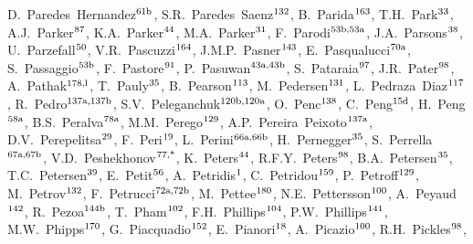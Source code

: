 \begin{flushleft}
D.~Paredes~Hernandez$^\textrm{\scriptsize 61b}$,    
S.R.~Paredes~Saenz$^\textrm{\scriptsize 132}$,    
B.~Parida$^\textrm{\scriptsize 163}$,    
T.H.~Park$^\textrm{\scriptsize 33}$,    
A.J.~Parker$^\textrm{\scriptsize 87}$,    
K.A.~Parker$^\textrm{\scriptsize 44}$,    
M.A.~Parker$^\textrm{\scriptsize 31}$,    
F.~Parodi$^\textrm{\scriptsize 53b,53a}$,    
J.A.~Parsons$^\textrm{\scriptsize 38}$,    
U.~Parzefall$^\textrm{\scriptsize 50}$,    
V.R.~Pascuzzi$^\textrm{\scriptsize 164}$,    
J.M.P.~Pasner$^\textrm{\scriptsize 143}$,    
E.~Pasqualucci$^\textrm{\scriptsize 70a}$,    
S.~Passaggio$^\textrm{\scriptsize 53b}$,    
F.~Pastore$^\textrm{\scriptsize 91}$,    
P.~Pasuwan$^\textrm{\scriptsize 43a,43b}$,    
S.~Pataraia$^\textrm{\scriptsize 97}$,    
J.R.~Pater$^\textrm{\scriptsize 98}$,    
A.~Pathak$^\textrm{\scriptsize 178,l}$,    
T.~Pauly$^\textrm{\scriptsize 35}$,    
B.~Pearson$^\textrm{\scriptsize 113}$,    
M.~Pedersen$^\textrm{\scriptsize 131}$,    
L.~Pedraza~Diaz$^\textrm{\scriptsize 117}$,    
R.~Pedro$^\textrm{\scriptsize 137a,137b}$,    
S.V.~Peleganchuk$^\textrm{\scriptsize 120b,120a}$,    
O.~Penc$^\textrm{\scriptsize 138}$,    
C.~Peng$^\textrm{\scriptsize 15d}$,    
H.~Peng$^\textrm{\scriptsize 58a}$,    
B.S.~Peralva$^\textrm{\scriptsize 78a}$,    
M.M.~Perego$^\textrm{\scriptsize 129}$,    
A.P.~Pereira~Peixoto$^\textrm{\scriptsize 137a}$,    
D.V.~Perepelitsa$^\textrm{\scriptsize 29}$,    
F.~Peri$^\textrm{\scriptsize 19}$,    
L.~Perini$^\textrm{\scriptsize 66a,66b}$,    
H.~Pernegger$^\textrm{\scriptsize 35}$,    
S.~Perrella$^\textrm{\scriptsize 67a,67b}$,    
V.D.~Peshekhonov$^\textrm{\scriptsize 77,*}$,    
K.~Peters$^\textrm{\scriptsize 44}$,    
R.F.Y.~Peters$^\textrm{\scriptsize 98}$,    
B.A.~Petersen$^\textrm{\scriptsize 35}$,    
T.C.~Petersen$^\textrm{\scriptsize 39}$,    
E.~Petit$^\textrm{\scriptsize 56}$,    
A.~Petridis$^\textrm{\scriptsize 1}$,    
C.~Petridou$^\textrm{\scriptsize 159}$,    
P.~Petroff$^\textrm{\scriptsize 129}$,    
M.~Petrov$^\textrm{\scriptsize 132}$,    
F.~Petrucci$^\textrm{\scriptsize 72a,72b}$,    
M.~Pettee$^\textrm{\scriptsize 180}$,    
N.E.~Pettersson$^\textrm{\scriptsize 100}$,    
A.~Peyaud$^\textrm{\scriptsize 142}$,    
R.~Pezoa$^\textrm{\scriptsize 144b}$,    
T.~Pham$^\textrm{\scriptsize 102}$,    
F.H.~Phillips$^\textrm{\scriptsize 104}$,    
P.W.~Phillips$^\textrm{\scriptsize 141}$,    
M.W.~Phipps$^\textrm{\scriptsize 170}$,    
G.~Piacquadio$^\textrm{\scriptsize 152}$,    
E.~Pianori$^\textrm{\scriptsize 18}$,    
A.~Picazio$^\textrm{\scriptsize 100}$,    
R.H.~Pickles$^\textrm{\scriptsize 98}$,    

\end{flushleft}
